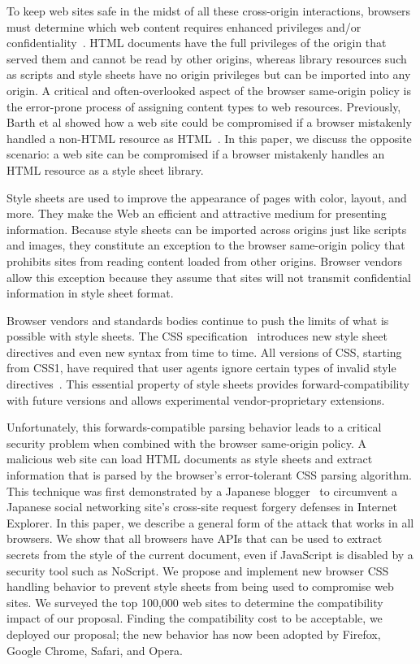 \documentclass{acm_proc_article-sp}
\begin{document}
To keep web sites safe in the midst of all these cross-origin interactions,
browsers must determine which web content requires enhanced privileges and/or
confidentiality~\cite{mashupos}. HTML documents have the full privileges of
the origin that served them and cannot be read by other origins, whereas
library resources such as scripts and style sheets have no origin privileges
but can be imported into any origin. A critical and often-overlooked aspect of
the browser same-origin policy is the error-prone process of assigning content types to web resources. Previously, Barth et al showed how a web site could be
compromised if a browser mistakenly handled a non-HTML resource as
HTML~\cite{securecontentsniffing}. In this paper, we discuss the opposite
scenario: a web site can be compromised if a browser mistakenly handles an
HTML resource as a style sheet library.

Style sheets are used to improve the appearance of pages with
color, layout, and more. They make the Web an efficient and attractive medium
for presenting information. Because style sheets can be imported across
origins just like scripts and images, they constitute an exception to the
browser same-origin policy that prohibits sites from reading content loaded
from other origins. Browser vendors allow this exception because they assume
that sites will not transmit confidential information in style sheet format.

Browser vendors and standards bodies continue to push the limits of what is
possible with style sheets. The CSS specification~\cite{cssspec} introduces
new style sheet directives and even new syntax from time to time. All versions
of CSS, starting from CSS1, have required that user agents ignore certain
types of invalid style directives~\cite{syndata}. This essential property of style sheets
provides forward-compatibility with future versions and allows experimental
vendor-proprietary extensions.

Unfortunately, this forwards-compatible parsing behavior leads to a critical
security problem when combined with the browser same-origin policy. A malicious
web site can load HTML documents as style sheets and extract information that
is parsed by the browser's error-tolerant CSS parsing algorithm. This
technique was first demonstrated by a Japanese blogger~\cite{cssxss} to
circumvent a Japanese social networking site's cross-site request forgery
defenses in Internet Explorer. In this paper, we describe a general form of
the attack that works in all browsers. We show that all browsers have APIs
that can be used to extract secrets from the style of the current document,
even if JavaScript is disabled by a security tool such as NoScript. We propose
and implement new browser CSS handling behavior to prevent style sheets from
being used to compromise web sites. We surveyed the top 100,000 web sites to
determine the compatibility impact of our proposal. Finding the compatibility
cost to be acceptable, we deployed our proposal; the new behavior has now been
adopted by Firefox, Google Chrome, Safari, and Opera.
\end{document}
